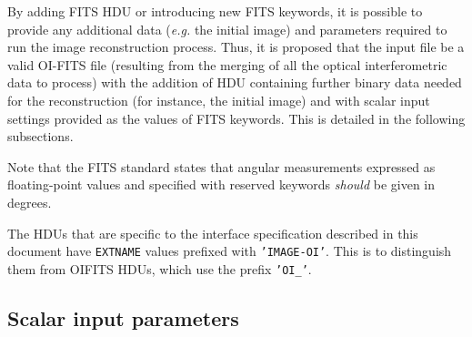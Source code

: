 \documentclass{article}
\newcommand*{\ROW}{} %
\newcommand*{\ROWTITLE}{} %
\newcommand{\KEYWORD}[1]{\texttt{#1}} %
\newcommand{\STRING}[1]{\texttt{'#1'}} %
\begin{document}
By adding FITS HDU or introducing new FITS keywords, it is possible to
provide any additional data (\emph{e.g.} the initial image) and
parameters required to run the image reconstruction process.  Thus, it
is proposed that the input file be a valid OI-FITS file (resulting
from the merging of all the optical interferometric data to process)
with the addition of HDU containing further binary data needed for the
reconstruction (for instance, the initial image) and with scalar input
settings provided as the values of FITS keywords.  This is detailed in
the following subsections.

Note that the FITS standard states that angular measurements expressed
as floating-point values and specified with reserved keywords
\emph{should} be given in degrees.

The HDUs that are specific to the interface specification described in
this document have \KEYWORD{EXTNAME} values prefixed with
\STRING{IMAGE-OI}. This is to distinguish them from OIFITS HDUs, which use the
prefix \STRING{OI\_}.


\subsection{Scalar input parameters}

\renewcommand{\ROW}[3]{\KEYWORD{#1} & #2 &#3 \\}
\renewcommand{\ROWTITLE}[1]{\multicolumn{3}{c}{\textbf{#1}} \\
  Keyword & Type & Description \\}
\end{document}

